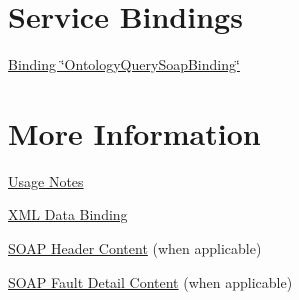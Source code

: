 \hypertarget{index_Service_bindings}{}\section{Service Bindings}\label{index_Service_bindings}

\begin{DoxyItemize}
\item \hyperlink{OntologyQuerySoapBinding}{Binding \char`\"{}OntologyQuerySoapBinding\char`\"{}}
\end{DoxyItemize}\hypertarget{index_Service_more}{}\section{More Information}\label{index_Service_more}

\begin{DoxyItemize}
\item \hyperlink{page_notes}{Usage Notes}
\end{DoxyItemize}


\begin{DoxyItemize}
\item \hyperlink{page_XMLDataBinding}{XML Data Binding}
\end{DoxyItemize}


\begin{DoxyItemize}
\item \hyperlink{structSOAP__ENV____Header}{SOAP Header Content} (when applicable)
\end{DoxyItemize}


\begin{DoxyItemize}
\item \hyperlink{structSOAP__ENV____Detail}{SOAP Fault Detail Content} (when applicable) 
\end{DoxyItemize}